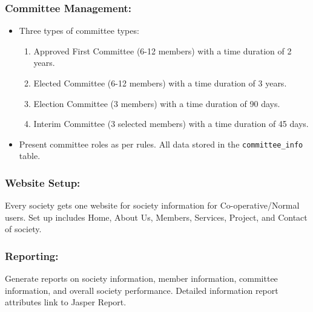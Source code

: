 \subsubsection*{Committee Management:}
\begin{itemize}
    \item Three types of committee types: 
    \begin{enumerate}
        \item Approved First Committee (6-12 members) with a time duration of 2 years.
        \item Elected Committee (6-12 members) with a time duration of 3 years.
        \item Election Committee (3 members) with a time duration of 90 days.
        \item Interim Committee (3 selected members) with a time duration of 45 days.
    \end{enumerate}
    \item Present committee roles as per rules. All data stored in the \texttt{committee\_info} table.
\end{itemize}

\subsubsection*{Website Setup:}
Every society gets one website for society information for Co-operative/Normal users. Set up includes Home, About Us, Members, Services, Project, and Contact of society.

\subsubsection*{Reporting:}
Generate reports on society information, member information, committee information, and overall society performance. Detailed information report attributes link to Jasper Report.



